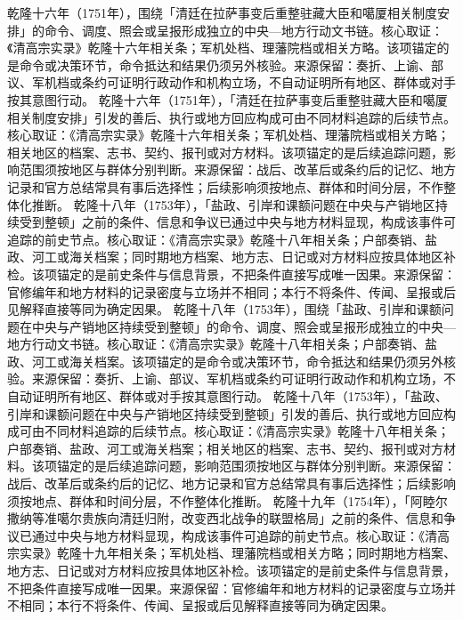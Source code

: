 乾隆十六年（1751年），围绕「清廷在拉萨事变后重整驻藏大臣和噶厦相关制度安排」的命令、调度、照会或呈报形成独立的中央—地方行动文书链。核心取证：《清高宗实录》乾隆十六年相关条；军机处档、理藩院档或相关方略。该项锚定的是命令或决策环节，命令抵达和结果仍须另外核验。来源保留：奏折、上谕、部议、军机档或条约可证明行政动作和机构立场，不自动证明所有地区、群体或对手按其意图行动。
乾隆十六年（1751年），「清廷在拉萨事变后重整驻藏大臣和噶厦相关制度安排」引发的善后、执行或地方回应构成可由不同材料追踪的后续节点。核心取证：《清高宗实录》乾隆十六年相关条；军机处档、理藩院档或相关方略；相关地区的档案、志书、契约、报刊或对方材料。该项锚定的是后续追踪问题，影响范围须按地区与群体分别判断。来源保留：战后、改革后或条约后的记忆、地方记录和官方总结常具有事后选择性；后续影响须按地点、群体和时间分层，不作整体化推断。
乾隆十八年（1753年），「盐政、引岸和课额问题在中央与产销地区持续受到整顿」之前的条件、信息和争议已通过中央与地方材料显现，构成该事件可追踪的前史节点。核心取证：《清高宗实录》乾隆十八年相关条；户部奏销、盐政、河工或海关档案；同时期地方档案、地方志、日记或对方材料应按具体地区补检。该项锚定的是前史条件与信息背景，不把条件直接写成唯一因果。来源保留：官修编年和地方材料的记录密度与立场并不相同；本行不将条件、传闻、呈报或后见解释直接等同为确定因果。
乾隆十八年（1753年），围绕「盐政、引岸和课额问题在中央与产销地区持续受到整顿」的命令、调度、照会或呈报形成独立的中央—地方行动文书链。核心取证：《清高宗实录》乾隆十八年相关条；户部奏销、盐政、河工或海关档案。该项锚定的是命令或决策环节，命令抵达和结果仍须另外核验。来源保留：奏折、上谕、部议、军机档或条约可证明行政动作和机构立场，不自动证明所有地区、群体或对手按其意图行动。
乾隆十八年（1753年），「盐政、引岸和课额问题在中央与产销地区持续受到整顿」引发的善后、执行或地方回应构成可由不同材料追踪的后续节点。核心取证：《清高宗实录》乾隆十八年相关条；户部奏销、盐政、河工或海关档案；相关地区的档案、志书、契约、报刊或对方材料。该项锚定的是后续追踪问题，影响范围须按地区与群体分别判断。来源保留：战后、改革后或条约后的记忆、地方记录和官方总结常具有事后选择性；后续影响须按地点、群体和时间分层，不作整体化推断。
乾隆十九年（1754年），「阿睦尔撒纳等准噶尔贵族向清廷归附，改变西北战争的联盟格局」之前的条件、信息和争议已通过中央与地方材料显现，构成该事件可追踪的前史节点。核心取证：《清高宗实录》乾隆十九年相关条；军机处档、理藩院档或相关方略；同时期地方档案、地方志、日记或对方材料应按具体地区补检。该项锚定的是前史条件与信息背景，不把条件直接写成唯一因果。来源保留：官修编年和地方材料的记录密度与立场并不相同；本行不将条件、传闻、呈报或后见解释直接等同为确定因果。
